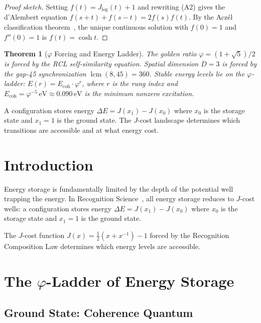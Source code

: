 \documentclass[12pt,a4paper]{article}
\newtheorem{theorem}{Theorem}[section]
\theoremstyle{definition}
\theoremstyle{remark}
\begin{document}
\begin{proof}[Proof sketch]
Setting $f(t) = J_{\log}(t) + 1$ and rewriting \textup{(A2)} gives the
d'Alembert equation $f(s+t) + f(s-t) = 2f(s)f(t)$.  By the Acz\'el
classification theorem~\cite{Aczel1966}, the unique continuous solution
with $f(0) = 1$ and $f''(0) = 1$ is $f(t) = \cosh t$.
\end{proof}

\begin{theorem}[$\varphi$ Forcing and Energy Ladder]\label{thm:phi}
The golden ratio $\varphi = (1+\sqrt{5})/2$ is forced by the RCL
self-similarity equation.  Spatial dimension $D = 3$ is forced by the
gap-45 synchronization $\operatorname{lcm}(8,45) = 360$.  Stable energy
levels lie on the $\varphi$-ladder: $E(r) = E_{\mathrm{coh}} \cdot \varphi^r$,
where $r$ is the rung index and $E_{\mathrm{coh}} = \varphi^{-5}\,\mathrm{eV}
\approx 0.090\,\mathrm{eV}$ is the minimum nonzero excitation.
\end{theorem}

\noindent A configuration stores energy $\Delta E = J(x_1) - J(x_0)$ where
$x_0$ is the storage state and $x_1 = 1$ is the ground state.  The
$J$-cost landscape determines which transitions are accessible and at
what energy cost.

\section{Introduction}
\label{sec:intro}

Energy storage is fundamentally limited by the depth of the potential well trapping 
the energy. In Recognition Science~\cite{RS_Axioms}, all energy storage reduces to
$J$-cost wells: a configuration stores energy $\Delta E = J(x_1) - J(x_0)$
where $x_0$ is the storage state and $x_1 = 1$ is the ground state.

The $J$-cost function $J(x) = \frac{1}{2}(x + x^{-1}) - 1$ forced by the
Recognition Composition Law determines which energy levels are accessible.

\section{The $\varphi$-Ladder of Energy Storage}

\subsection{Ground State: Coherence Quantum}
\end{document}
